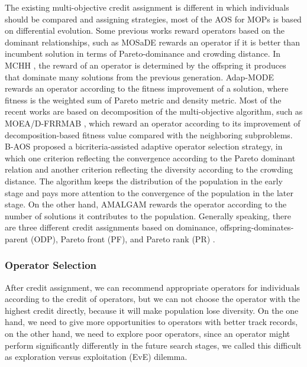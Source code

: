\documentclass[journal]{IEEEtran}
\begin{document}
The existing multi-objective credit assignment is different in which individuals should be compared and assigning strategies, most of the AOS for MOPs is based on differential evolution.
Some previous works reward operators based on the dominant relationships,
such as MOSaDE \cite{huang2007multi} rewards an operator if it is better than incumbent solution in terms of Pareto-dominance and crowding distance.
In MCHH \cite{mcclymont2011markov}, the reward of an operator is determined by the offspring it produces that dominate many solutions from the previous generation. Adap-MODE \cite{li2011multi} rewards an operator according to the fitness improvement of a solution, where fitness is the weighted sum of Pareto metric and density metric.
Most of the recent works are based on decomposition of the multi-objective algorithm, such as MOEA/D-FRRMAB \cite{frrmab}, which reward an operator according to its improvement of decomposition-based fitness value compared with the neighboring subproblems.
B-AOS \cite{lin2021decomposition} proposed a bicriteria-assisted adaptive operator selection strategy, in which one criterion reflecting the convergence according to the Pareto dominant relation and another criterion reflecting the diversity according to the crowding distance.
The algorithm keeps the distribution of the population in the early stage and pays more attention to the convergence of the population in the later stage.
On the other hand, AMALGAM \cite{vrugt2007improved} rewards the operator according to the number of solutions it contributes to the population.
Generally speaking, there are three different credit assignments based on dominance, offspring-dominates-parent (ODP), Pareto front (PF), and Pareto rank (PR) \cite{hitomi2015effect}.

\subsubsection{Operator Selection}
After credit assignment, we can recommend appropriate operators for individuals according to the credit of operators, but we can not choose the operator with the highest credit directly, because it will make population lose diversity.
On the one hand, we need to give more opportunities to operators with better track records, on the other hand, we need to explore poor operators, since an operator might perform significantly differently in the future search stages, we called this difficult as exploration versus exploitation (EvE) dilemma.
\end{document}
